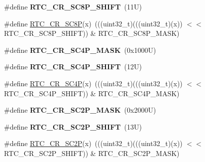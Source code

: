 \begin{DoxyCompactItemize}
\item 
\mbox{\label{group___r_t_c___register___masks_ga4bb07384fbca5f19f9e7b30daa071b92}} 
\#define {\bfseries R\+T\+C\+\_\+\+C\+R\+\_\+\+S\+C8\+P\+\_\+\+S\+H\+I\+FT}~(11\+U)
\item 
\#define \mbox{\hyperlink{group___r_t_c___register___masks_gae339c78e8f2d1fc58e9a0adad68a537a}{R\+T\+C\+\_\+\+C\+R\+\_\+\+S\+C8P}}(x)~(((uint32\+\_\+t)(((uint32\+\_\+t)(x)) $<$$<$ R\+T\+C\+\_\+\+C\+R\+\_\+\+S\+C8\+P\+\_\+\+S\+H\+I\+FT)) \& R\+T\+C\+\_\+\+C\+R\+\_\+\+S\+C8\+P\+\_\+\+M\+A\+SK)
\item 
\mbox{\label{group___r_t_c___register___masks_gaf39585370663a36a6eba4dd1fe61534f}} 
\#define {\bfseries R\+T\+C\+\_\+\+C\+R\+\_\+\+S\+C4\+P\+\_\+\+M\+A\+SK}~(0x1000\+U)
\item 
\mbox{\label{group___r_t_c___register___masks_ga348565e2fabae104ce15d3b0e23b4fc1}} 
\#define {\bfseries R\+T\+C\+\_\+\+C\+R\+\_\+\+S\+C4\+P\+\_\+\+S\+H\+I\+FT}~(12\+U)
\item 
\#define \mbox{\hyperlink{group___r_t_c___register___masks_gadb156be75959e7c745befbc41aedbba7}{R\+T\+C\+\_\+\+C\+R\+\_\+\+S\+C4P}}(x)~(((uint32\+\_\+t)(((uint32\+\_\+t)(x)) $<$$<$ R\+T\+C\+\_\+\+C\+R\+\_\+\+S\+C4\+P\+\_\+\+S\+H\+I\+FT)) \& R\+T\+C\+\_\+\+C\+R\+\_\+\+S\+C4\+P\+\_\+\+M\+A\+SK)
\item 
\mbox{\label{group___r_t_c___register___masks_ga7eb15eb098b99b007a0fef42c3fef848}} 
\#define {\bfseries R\+T\+C\+\_\+\+C\+R\+\_\+\+S\+C2\+P\+\_\+\+M\+A\+SK}~(0x2000\+U)
\item 
\mbox{\label{group___r_t_c___register___masks_gacd1a88b76256f8efc3633459f3c21d83}} 
\#define {\bfseries R\+T\+C\+\_\+\+C\+R\+\_\+\+S\+C2\+P\+\_\+\+S\+H\+I\+FT}~(13\+U)
\item 
\#define \mbox{\hyperlink{group___r_t_c___register___masks_ga520f43e41947a4a6b81d08912c3d4a0a}{R\+T\+C\+\_\+\+C\+R\+\_\+\+S\+C2P}}(x)~(((uint32\+\_\+t)(((uint32\+\_\+t)(x)) $<$$<$ R\+T\+C\+\_\+\+C\+R\+\_\+\+S\+C2\+P\+\_\+\+S\+H\+I\+FT)) \& R\+T\+C\+\_\+\+C\+R\+\_\+\+S\+C2\+P\+\_\+\+M\+A\+SK)
\end{DoxyCompactItemize}
